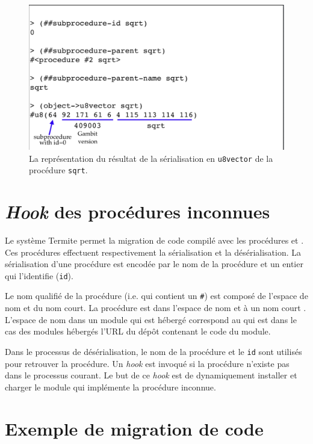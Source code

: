 \begin{figure}[ht]
  \centering
  \includegraphics[scale=0.25]{figures/proc-serialization}
  \caption{La représentation du résultat de la sérialisation en \texttt{u8vector} de la procédure
    \texttt{sqrt}.}
  \label{fig:proc_serialization}
\end{figure}

\section{\textit{Hook} des procédures inconnues}
%
Le système Termite permet la migration de code compilé avec les procédures
 et . Ces procédures
effectuent respectivement la sérialisation et la désérialisation.
La sérialisation d'une procédure est encodée par le nom de la procédure et
un entier qui l'identifie (\texttt{id}).

Le nom qualifié de la procédure (i.e. qui contient un \texttt{\#}) est composé
de l'espace de nom et du nom court. La procédure  est
dans l'espace de nom  et à un nom court .
L'espace de nom dans un module qui est hébergé correspond au 
qui est dans le cas des modules hébergés l'URL du dépôt contenant
le code du module.

Dans le processus de désérialisation, le nom de la procédure et le \texttt{id}
sont utilisés pour retrouver la procédure. Un \textit{hook} est invoqué
si la procédure n'existe pas dans le processus courant. Le but de
ce \textit{hook} est de dynamiquement installer et charger le module 
qui implémente la procédure inconnue.

\section{Exemple de migration de code}

